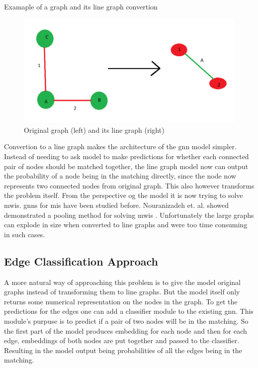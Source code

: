 Examaple of a graph and its line graph convertion
\begin{figure}[H]
    \centering
    \includegraphics[scale=0.5]{figures/LineGraphExample}
    \caption{Original graph (left) and its line graph (right)}
    \label{Line graph figure}
\end{figure}

Convertion to a line graph makes the architecture of the \gls{gnn} model simpler. Instead of needing to ask model to make predictions for whether each connected pair of nodes should be matched together, the line graph model now can output the probability of a node being in the matching directly, since the node now represents two connected nodes from original graph. This also however transforms the problem itself. From the perspective og the model it is now trying to solve \gls{mwis}. \gls{gnn}s for \gls{mis} have been studied before. Nouranizadeh et. al. showed demonstrated a pooling method for solving \gls{mwis} \cite{DBLPjournals/corr/abs-2107-01410}. Unfortunately the large graphs can explode in size when converted to line graphs and were too time consuming in such cases.

\subsection{Edge Classification Approach}

A more natural way of approaching this problem is to give the model original graphs instead of transforming them to line graphs. But the model itself only returns some numerical representation on the nodes in the graph. To get the predictions for the edges one can add a classifier module to the existing \gls{gnn}. This module's purpuse is to predict if a pair of two nodes will be in the matching. So the first part of the model produces embedding for each node and then for each edge, embeddings of both nodes are put together and passed to the classifier. Resulting in the model output being probabilities of all the edges being in the matching.

